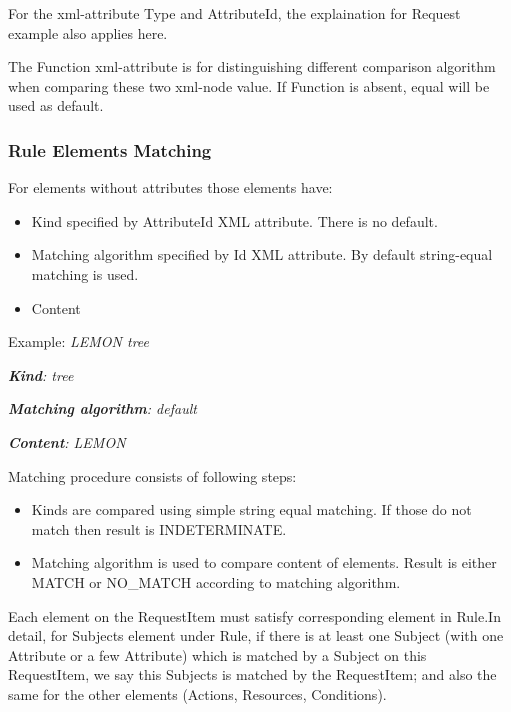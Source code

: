 \documentclass[a4paper]{article}
\newcommand\liststyleWWviiiNumxxii{%
\renewcommand\theenumi{\arabic{enumi}}
\renewcommand\theenumii{\arabic{enumii}}
\renewcommand\theenumiii{\arabic{enumiii}}
\renewcommand\labelitemi{o}
\renewcommand\labelenumi{\theenumi.}
\renewcommand\labelenumii{\theenumii.}
\renewcommand\labelenumiii{\theenumiii.}
}
\newcommand\liststyleWWviiiNumxxiii{%
\renewcommand\theenumi{\arabic{enumi}}
\renewcommand\theenumii{\arabic{enumii}}
\renewcommand\theenumiii{\arabic{enumiii}}
\renewcommand\labelitemi{{}-}
\renewcommand\labelenumi{\theenumi.}
\renewcommand\labelenumii{\theenumii.}
\renewcommand\labelenumiii{\theenumiii.}
}
\begin{document}
{\color{black}
For the xml-attribute {\textquotedbl}Type{\textquotedbl} and
{\textquotedbl}AttributeId{\textquotedbl}, the explaination for Request
example also applies here.}

{\color{black}
The {\textquotedbl}Function{\textquotedbl} xml-attribute is for
distinguishing different comparison algorithm when comparing these two
xml-node value. If Function is absent,
{\textquotedbl}equal{\textquotedbl} will be used as default.}

\subsubsection{Rule Elements Matching}
{\color{black}
For elements without attributes those elements have:}

\liststyleWWviiiNumxxii
\begin{itemize}
\item {\color{black}
Kind specified by AttributeId XML attribute. There is no default.}
\item {\color{black}
Matching algorithm specified by Id XML attribute. By default
string-equal matching is used.}
\item {\color{black}
Content}
\end{itemize}
{\upshape\color{black}
\foreignlanguage{english}{Example:
}\foreignlanguage{english}{\textit{LEMON tree}}}

{\upshape\color{black}
\foreignlanguage{english}{\textbf{\textit{Kind}}}\foreignlanguage{english}{\textit{:
tree}}}

{\upshape\color{black}
\foreignlanguage{english}{\textbf{\textit{Matching
algorithm}}}\foreignlanguage{english}{\textit{: default}}}

{\upshape\color{black}
\foreignlanguage{english}{\textbf{\textit{Content}}}\foreignlanguage{english}{\textit{:
LEMON}}}

{\color{black}
Matching procedure consists of following steps:}

\liststyleWWviiiNumxxiii
\begin{itemize}
\item {\color{black}
Kinds are compared using simple string equal matching. If those do not
match then result is INDETERMINATE.}
\item {\color{black}
Matching algorithm is used to compare content of elements. Result is
either MATCH or NO\_MATCH according to matching algorithm.}
\end{itemize}
{\color{black}
Each element on the RequestItem must satisfy corresponding element in
Rule.In detail, for Subjects element under Rule, if there is at least
one Subject (with one Attribute or a few Attribute) which is matched by
a Subject on this RequestItem, we say this Subjects is matched by the
RequestItem; and also the same for the other elements (Actions,
Resources, Conditions).}
\end{document}
